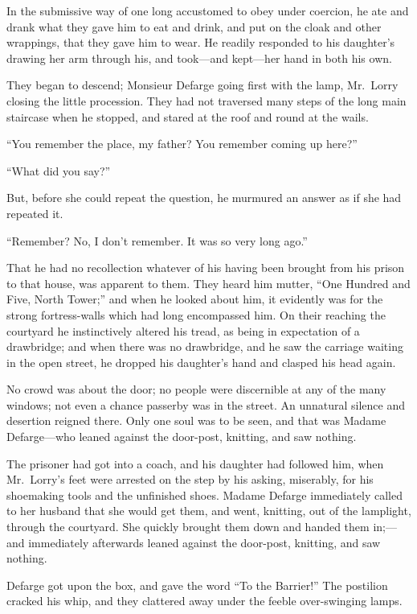 In the submissive way of one long accustomed to obey under coercion,
he ate and drank what they gave him to eat and drink, and put on the
cloak and other wrappings, that they gave him to wear.  He readily
responded to his daughter's drawing her arm through his, and
took---and kept---her hand in both his own.

They began to descend; Monsieur Defarge going first with the lamp,
Mr.\ Lorry closing the little procession.  They had not traversed many
steps of the long main staircase when he stopped, and stared at the
roof and round at the wails.

``You remember the place, my father?  You remember coming up here?''

``What did you say?''

But, before she could repeat the question, he murmured an answer as
if she had repeated it.

``Remember?  No, I don't remember.  It was so very long ago.''

That he had no recollection whatever of his having been brought from
his prison to that house, was apparent to them.  They heard him mutter,
``One Hundred and Five, North Tower;'' and when he looked about him, it
evidently was for the strong fortress-walls which had long encompassed him.
On their reaching the courtyard he instinctively altered his tread,
as being in expectation of a drawbridge; and when there was no
drawbridge, and he saw the carriage waiting in the open street, he
dropped his daughter's hand and clasped his head again.

No crowd was about the door; no people were discernible at any of the
many windows; not even a chance passerby was in the street.  An unnatural
silence and desertion reigned there.  Only one soul was to be seen,
and that was Madame Defarge---who leaned against the door-post,
knitting, and saw nothing.

The prisoner had got into a coach, and his daughter had followed him,
when Mr.\ Lorry's feet were arrested on the step by his asking,
miserably, for his shoemaking tools and the unfinished shoes.  Madame
Defarge immediately called to her husband that she would get them,
and went, knitting, out of the lamplight, through the courtyard.  She
quickly brought them down and handed them in;---and immediately
afterwards leaned against the door-post, knitting, and saw nothing.

Defarge got upon the box, and gave the word ``To the Barrier!''
The postilion cracked his whip, and they clattered away under
the feeble over-swinging lamps.


